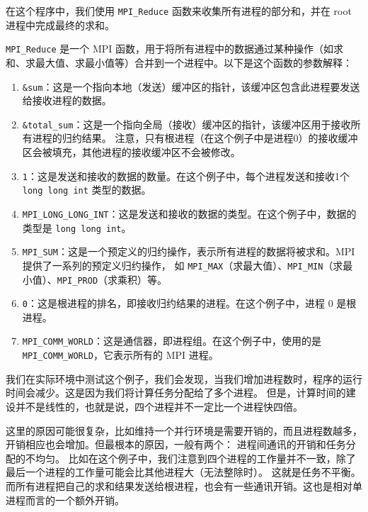\documentclass{ctexart}
\begin{document}
在这个程序中，我们使用 \verb|MPI_Reduce| 函数来收集所有进程的部分和，并在 root 进程中完成最终的求和。

\verb|MPI_Reduce| 是一个 MPI 函数，用于将所有进程中的数据通过某种操作（如求和、求最大值、求最小值等）合并到一个进程中。以下是这个函数的参数解释：  
  
\begin{enumerate}  
    \item \verb|&sum|：这是一个指向本地（发送）缓冲区的指针，该缓冲区包含此进程要发送给接收进程的数据。  
  
    \item \verb|&total_sum|：这是一个指向全局（接收）缓冲区的指针，该缓冲区用于接收所有进程的归约结果。
    注意，只有根进程（在这个例子中是进程0）的接收缓冲区会被填充，其他进程的接收缓冲区不会被修改。  
  
    \item \verb|1|：这是发送和接收的数据的数量。在这个例子中，每个进程发送和接收1个 \verb|long long int| 类型的数据。  
  
    \item \verb|MPI_LONG_LONG_INT|：这是发送和接收的数据的类型。在这个例子中，数据的类型是 \verb|long long int|。  
  
    \item \verb|MPI_SUM|：这是一个预定义的归约操作，表示所有进程的数据将被求和。MPI 提供了一系列的预定义归约操作，
    如 \verb|MPI_MAX|（求最大值）、\verb|MPI_MIN|（求最小值）、\verb|MPI_PROD|（求乘积）等。  
  
    \item \verb|0|：这是根进程的排名，即接收归约结果的进程。在这个例子中，进程 0 是根进程。  
  
    \item \verb|MPI_COMM_WORLD|：这是通信器，即进程组。在这个例子中，使用的是 \verb|MPI_COMM_WORLD|，它表示所有的 MPI 进程。  
\end{enumerate}  

我们在实际环境中测试这个例子，我们会发现，当我们增加进程数时，程序的运行时间会减少。这是因为我们将计算任务分配给了多个进程。
但是，计算时间的建设并不是线性的，也就是说，四个进程并不一定比一个进程快四倍。

这里的原因可能很复杂，比如维持一个并行环境是需要开销的，而且进程数越多，开销相应也会增加。但最根本的原因，一般有两个：
进程间通讯的开销和任务分配的不均匀。
比如在这个例子中，我们注意到四个进程的工作量并不一致，除了最后一个进程的工作量可能会比其他进程大（无法整除时）。
这就是任务不平衡。而所有进程把自己的求和结果发送给根进程，也会有一些通讯开销。这也是相对单进程而言的一个额外开销。
\end{document}
